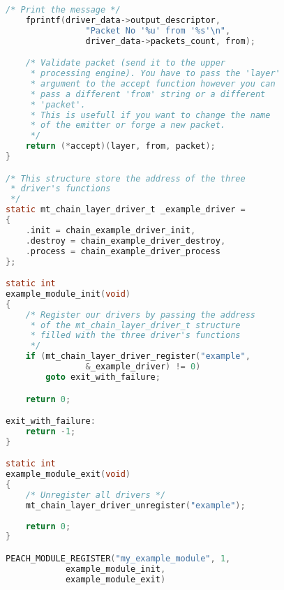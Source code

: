 \begin{lstlisting}[language=C,
caption=Complete Processing engine \& Module example]
    /* Print the message */
    fprintf(driver_data->output_descriptor, 
                "Packet No '%u' from '%s'\n",
                driver_data->packets_count, from);

    /* Validate packet (send it to the upper 
     * processing engine). You have to pass the 'layer'
     * argument to the accept function however you can
     * pass a different 'from' string or a different 
     * 'packet'. 
     * This is usefull if you want to change the name 
     * of the emitter or forge a new packet.
     */
    return (*accept)(layer, from, packet);
}

/* This structure store the address of the three
 * driver's functions
 */
static mt_chain_layer_driver_t _example_driver =
{
    .init = chain_example_driver_init,
    .destroy = chain_example_driver_destroy,
    .process = chain_example_driver_process
};

static int
example_module_init(void)
{
    /* Register our drivers by passing the address
     * of the mt_chain_layer_driver_t structure
     * filled with the three driver's functions 
     */
    if (mt_chain_layer_driver_register("example", 
                &_example_driver) != 0) 
        goto exit_with_failure;

    return 0;

exit_with_failure:
    return -1;
}

static int
example_module_exit(void)
{
    /* Unregister all drivers */
    mt_chain_layer_driver_unregister("example");
    
    return 0;
}

PEACH_MODULE_REGISTER("my_example_module", 1,
            example_module_init,
            example_module_exit)

\end{lstlisting}
